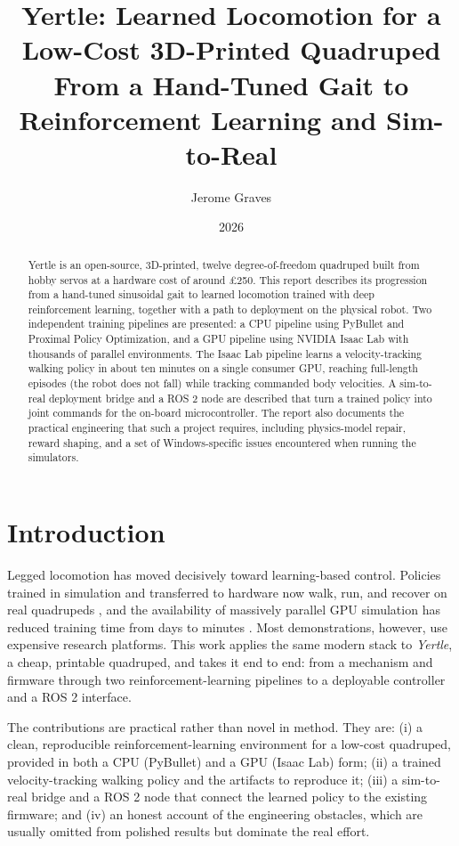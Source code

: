 \documentclass[11pt]{article}
\title{\textbf{Yertle: Learned Locomotion for a Low-Cost 3D-Printed Quadruped}\\
\large From a Hand-Tuned Gait to Reinforcement Learning and Sim-to-Real}
\author{Jerome Graves}
\date{2026}
\begin{document}
\maketitle

\begin{abstract}
\noindent
Yertle is an open-source, 3D-printed, twelve degree-of-freedom quadruped built
from hobby servos at a hardware cost of around \pounds 250. This report describes
its progression from a hand-tuned sinusoidal gait to learned locomotion trained
with deep reinforcement learning, together with a path to deployment on the
physical robot. Two independent training pipelines are presented: a CPU pipeline
using PyBullet and Proximal Policy Optimization, and a GPU pipeline using NVIDIA
Isaac Lab with thousands of parallel environments. The Isaac Lab pipeline learns
a velocity-tracking walking policy in about ten minutes on a single consumer GPU,
reaching full-length episodes (the robot does not fall) while tracking commanded
body velocities. A sim-to-real deployment bridge and a ROS 2 node are described
that turn a trained policy into joint commands for the on-board microcontroller.
The report also documents the practical engineering that such a project requires,
including physics-model repair, reward shaping, and a set of Windows-specific
issues encountered when running the simulators.
\end{abstract}

\section{Introduction}
Legged locomotion has moved decisively toward learning-based control. Policies
trained in simulation and transferred to hardware now walk, run, and recover on
real quadrupeds \cite{hwangbo2019anymal}, and the availability of massively
parallel GPU simulation has reduced training time from days to
minutes \cite{rudin2022minutes}. Most demonstrations, however, use expensive
research platforms. This work applies the same modern stack to \emph{Yertle}, a
cheap, printable quadruped, and takes it end to end: from a mechanism and
firmware through two reinforcement-learning pipelines to a deployable controller
and a ROS 2 interface.

The contributions are practical rather than novel in method. They are: (i) a
clean, reproducible reinforcement-learning environment for a low-cost quadruped,
provided in both a CPU (PyBullet) and a GPU (Isaac Lab) form; (ii) a trained
velocity-tracking walking policy and the artifacts to reproduce it; (iii) a
sim-to-real bridge and a ROS 2 node that connect the learned policy to the
existing firmware; and (iv) an honest account of the engineering obstacles, which
are usually omitted from polished results but dominate the real effort.
\end{document}
